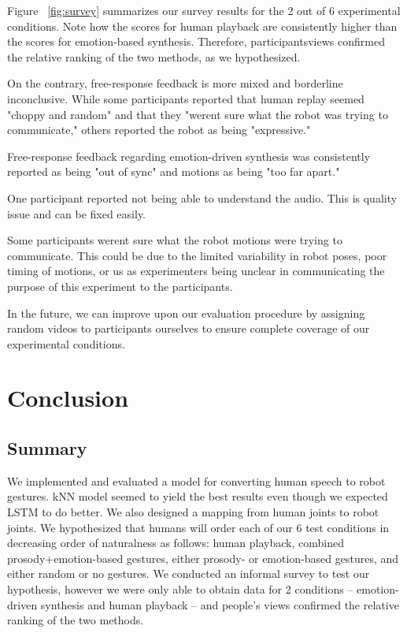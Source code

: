 Figure ~\ref{fig:survey} summarizes our survey results for the 2 out of 6 experimental conditions. Note how the scores for human playback are consistently higher than the scores for emotion-based synthesis. Therefore, participants\textquotesingle views confirmed the relative ranking of the two methods, as we hypothesized.

On the contrary, free-response feedback is more mixed and borderline inconclusive. While some participants reported that human replay seemed "choppy and random" and that they "weren\textquotesingle t sure what the robot was trying to communicate," others reported the robot as being "expressive."

Free-response feedback regarding emotion-driven synthesis was consistently reported as being "out of sync" and motions as being "too far apart."

One participant reported not being able to understand the audio. This is quality issue and can be fixed easily. 

Some participants weren\textquotesingle t sure what the robot motions were trying to communicate. This could be due to the limited variability in robot poses, poor timing of motions, or us as experimenters being unclear in communicating the purpose of this experiment to the participants.

In the future, we can improve upon our evaluation procedure by assigning random videos to participants ourselves to ensure complete coverage of our experimental conditions.

\section{Conclusion}
\subsection{Summary}
We implemented and evaluated a model for converting human speech to robot gestures. kNN model seemed to yield the best results even though we expected LSTM to do better. We also designed a mapping from human joints to robot joints. We hypothesized that humans will order each of our 6 test conditions in decreasing order of naturalness as follows: human playback, combined prosody+emotion-based gestures, either prosody- or emotion-based gestures, and either random or no gestures. We conducted an informal survey to test our hypothesis, however we were only able to obtain data for 2 conditions -- emotion-driven synthesis and human playback -- and people's views confirmed the relative ranking of the two methods.

